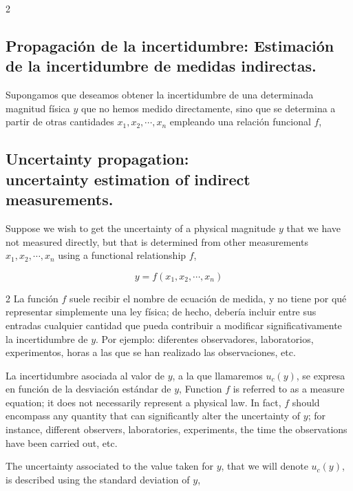 \begin{paracol}{2}

\subsection{Propagación de la incertidumbre: Estimación de la incertidumbre de medidas indirectas.}

Supongamos que deseamos obtener la incertidumbre de una determinada magnitud física $y$ que no hemos medido directamente, sino que se determina a partir de otras cantidades $x_1,x_2,\cdots,x_n$ empleando una relación funcional $f$,

\switchcolumn
\subsection{Uncertainty propagation:\\ uncertainty estimation of indirect measurements.}

Suppose we wish to get the uncertainty of a physical magnitude $y$ that we have not measured directly, but that is determined from other measurements $x_1,x_2,\cdots,x_n$ using a functional relationship $f$,  
\end{paracol}

\begin{equation*}
y = f(x_1,x_2,\cdots,x_n)
\end{equation*}

\begin{paracol}{2}
La función $f$ suele recibir el nombre de ecuación de medida, y no tiene por qué representar simplemente una ley física; de hecho, debería incluir entre sus entradas cualquier cantidad que pueda contribuir a modificar significativamente la incertidumbre de $y$. Por ejemplo: diferentes observadores, laboratorios, experimentos, horas a las que se han realizado las observaciones, etc.

La incertidumbre asociada al valor de $y$, a la que llamaremos $u_c(y)$, se expresa en función de la desviación estándar de $y$,  
\switchcolumn
Function $f$ is referred to as a measure equation; it does not necessarily represent a physical law. In fact, $f$ should encompass any quantity that can significantly alter the uncertainty of $y$; for instance, different observers, laboratories, experiments, the time the observations have been carried out, etc.   

The uncertainty associated to the value taken for $y$, that we will denote $u_c(y)$, is described using the standard deviation of $y$,
\end{paracol}


